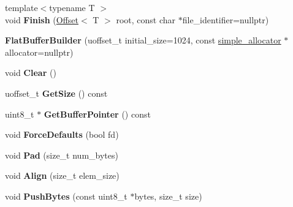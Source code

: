 \begin{DoxyCompactItemize}
{\footnotesize template$<$typename T $>$ }\\void {\bfseries Finish} (\hyperlink{structflatbuffers_1_1Offset}{Offset}$<$ T $>$ root, const char $\ast$file\+\_\+identifier=nullptr)
\item 
\mbox{\label{classflatbuffers_1_1FlatBufferBuilder_ac72b54a75e0c329e0ce0b8fab758e256}} 
{\bfseries Flat\+Buffer\+Builder} (uoffset\+\_\+t initial\+\_\+size=1024, const \hyperlink{classflatbuffers_1_1simple__allocator}{simple\+\_\+allocator} $\ast$allocator=nullptr)
\item 
\mbox{\label{classflatbuffers_1_1FlatBufferBuilder_ae94b94ba71ea0aeb2d9a98c43b713412}} 
void {\bfseries Clear} ()
\item 
\mbox{\label{classflatbuffers_1_1FlatBufferBuilder_a66c8fd33ab9b3b237954c9ea38648f7f}} 
uoffset\+\_\+t {\bfseries Get\+Size} () const
\item 
\mbox{\label{classflatbuffers_1_1FlatBufferBuilder_ab81ab8aa273c270b0942fd81489cad83}} 
uint8\+\_\+t $\ast$ {\bfseries Get\+Buffer\+Pointer} () const
\item 
\mbox{\label{classflatbuffers_1_1FlatBufferBuilder_a16a8fd46b34ad7727406c37b65b6b27a}} 
void {\bfseries Force\+Defaults} (bool fd)
\item 
\mbox{\label{classflatbuffers_1_1FlatBufferBuilder_a12a56ad2f97e96684cdaf1fb2bc1f54f}} 
void {\bfseries Pad} (size\+\_\+t num\+\_\+bytes)
\item 
\mbox{\label{classflatbuffers_1_1FlatBufferBuilder_a36f8ec515b27ed6daf4ef96722fb00be}} 
void {\bfseries Align} (size\+\_\+t elem\+\_\+size)
\item 
\mbox{\label{classflatbuffers_1_1FlatBufferBuilder_ac9e8e1034d8c1b3bfdf3514fc42d3aef}} 
void {\bfseries Push\+Bytes} (const uint8\+\_\+t $\ast$bytes, size\+\_\+t size)
\item 
\mbox{\label{classflatbuffers_1_1FlatBufferBuilder_a3c9d6c4515c7b7a03dbb8de3af2b297d}} 

\end{DoxyCompactItemize}
